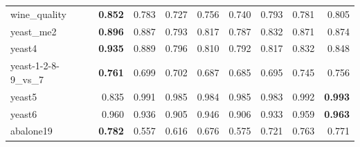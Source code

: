 \begin{table}[!htbp]
{\begin{tabular}{lrrrrrrrr}
 	wine\_quality & \textbf{0.852} & 0.783 & 0.727 & 0.756 & 0.740 & 0.793 & 0.781 & 0.805 \\
 	yeast\_me2 & \textbf{0.896} & 0.887 & 0.793 & 0.817 & 0.787 & 0.832 & 0.871 & 0.874 \\
 	yeast4 & \textbf{0.935} & 0.889 & 0.796 & 0.810 & 0.792 & 0.817 & 0.832 & 0.848 \\
 	yeast-1-2-8-9\_vs\_7 & \textbf{0.761} & 0.699 & 0.702 & 0.687 & 0.685 & 0.695 & 0.745 & 0.756 \\
 	yeast5 & 0.835 & 0.991 & 0.985 & 0.984 & 0.985 & 0.983 & 0.992 & \textbf{0.993} \\
 	yeast6 & 0.960 & 0.936 & 0.905 & 0.946 & 0.906 & 0.933 & 0.959 & \textbf{0.963} \\
 	abalone19 & \textbf{0.782} & 0.557 & 0.616 & 0.676 & 0.575 & 0.721 & 0.763 & 0.771 \\
 	\bottomrule
 \end{tabular}%
		
	}
	\label{tab:AUCAllDatasets}%
\end{table}%


